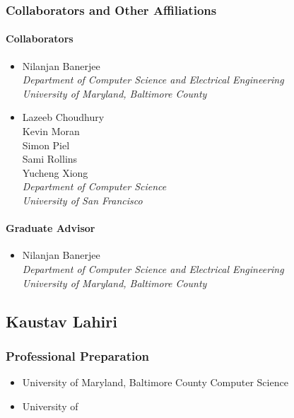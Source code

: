     \subsubsection{Collaborators and Other Affiliations}
      \paragraph{Collaborators}
	\begin{itemize}
          \item Nilanjan Banerjee\\
            \textit{Department of Computer Science and Electrical Engineering
              \\University of Maryland, Baltimore County}
          \item Lazeeb Choudhury\\
            Kevin Moran\\
            Simon Piel\\
            Sami Rollins\\
            Yucheng Xiong\\
            \textit{Department of Computer Science\\University of San
	      Francisco}
        \end{itemize}
      \paragraph{Graduate Advisor}
	\begin{itemize}
          \item Nilanjan Banerjee\\
            \textit{Department of Computer Science and Electrical Engineering\\
              University of Maryland, Baltimore County}
        \end{itemize}
  \subsection{Kaustav Lahiri}
    \subsubsection{Professional Preparation}
      \begin{itemize}
        \item University of Maryland, Baltimore County \hspace{20pt} Computer
	  Science \hfill 
	\item University of \hfill 
      \end{itemize}
